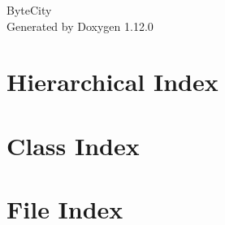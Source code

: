 \documentclass[twoside]{book}
\newcommand{\+}{\discretionary{\mbox{\scriptsize$\hookleftarrow$}}{}{}}
\newcommand{\clearemptydoublepage}{%
    \newpage{\pagestyle{empty}\cleardoublepage}%
  }
\begin{document}
  \raggedbottom
    \hypersetup{pageanchor=false,
                bookmarksnumbered=true,
                pdfencoding=unicode
               }
  \begin{titlepage}
  \vspace*{7cm}
  \begin{center}%
  {\Large Byte\+City}\\
  \vspace*{1cm}
  {\large Generated by Doxygen 1.12.0}\\
  \end{center}
  \end{titlepage}
  \clearemptydoublepage
  \tableofcontents
  \clearemptydoublepage
  \hypersetup{pageanchor=true}
\chapter{Hierarchical Index}

\chapter{Class Index}

\chapter{File Index}

\end{document}
